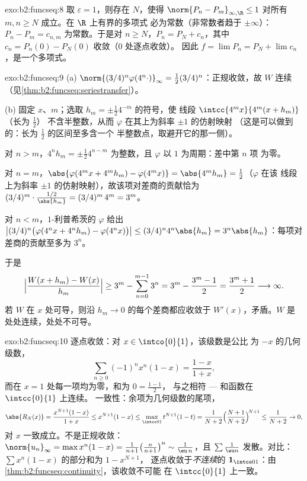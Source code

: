 \begin{solution}{exo:b2:funcseq:8}
取 $\varepsilon = 1$，则存在 $N$，使得 $\norm{P_n - P_m}_{\infty,
\R} \leq 1$ 对所有 $m, n \geq N$ 成立。在 $\R$ 上有界的多项式
必为常数（非常数者趋于 $\pm\infty$）：$P_n - P_m =
c_{n,m}$ 为常数。于是对 $n \geq N$，$P_n = P_N + c_n$，其中
$c_n = P_n(0) - P_N(0)$ 收敛（$0$ 处逐点收敛）。
因此 $f = \lim P_n = P_N + \lim c_n$，是一个多项式。
\end{solution}

\begin{solution}{exo:b2:funcseq:9}
(a) $\norm{(3/4)^n\varphi(4^n\cdot)}_\infty = \frac12
(3/4)^n$：正规收敛，故 $W$ 连续
（见\cref{thm:b2:funcseq:seriestransfer}）。

(b) 固定 $x$、$m$；选取 $h_m = \pm\frac12 4^{-m}$ 的符号，使
线段 $\intcc{4^mx}{4^m(x + h_m)}$（长为 $\frac12$）
不含半整数，从而 $\varphi$ 在其上为斜率 $\pm1$ 的仿射映射
（这是可以做到的：长为 $\frac12$ 的区间至多含一个
半整数点，取避开它的那一侧）。

对 $n > m$，$4^n h_m = \pm\frac12 4^{n-m}$ 为整数，且
$\varphi$ 以 $1$ 为周期：差中第 $n$ 项
为零。

对 $n = m$，$\abs{\varphi(4^m x + 4^m h_m) - \varphi(4^m x)} =
\abs{4^m h_m} = \frac12$（$\varphi$ 在该
线段上为斜率 $\pm 1$ 的仿射映射），故该项对差商的贡献恰为 $(3/4)^m \cdot
\frac{1/2}{\abs{h_m}} = (3/4)^m\,4^m = 3^m$。

对 $n < m$，$1$-利普希茨的 $\varphi$ 给出
$\bigl|(3/4)^n\bigl(\varphi(4^nx + 4^nh_m) -
\varphi(4^nx)\bigr)\bigr| \leq (3/4)^n 4^n\abs{h_m} =
3^n\abs{h_m}$：每项对差商的贡献至多为 $3^n$。

于是
\[
\Bigl|\frac{W(x + h_m) - W(x)}{h_m}\Bigr|
\geq 3^m - \sum_{n=0}^{m-1} 3^n
= 3^m - \frac{3^m - 1}{2} = \frac{3^m + 1}{2}
\longrightarrow \infty .
\]
若 $W$ 在 $x$ 处可导，则沿
$h_m \to 0$ 的每个差商都应收敛于 $W'(x)$，矛盾。$W$ 是
处处连续，处处不可导。
\end{solution}

\begin{solution}{exo:b2:funcseq:10}
逐点收敛：对 $x \in \intco{0}{1}$，该级数是公比
为 $-x$ 的几何级数，
\[
\sum_{n\geq0}(-1)^n x^n(1-x) = \frac{1-x}{1+x},
\]
而在 $x = 1$ 处每一项均为零，和为 $0 = \frac{1-1}{2}$，
与之相符 --- 和函数在 $\intcc{0}{1}$ 上连续。
一致性：余项为几何级数的尾项，
\[
\abs{R_N(x)} = \frac{x^{N+1}(1-x)}{1+x} \leq x^{N+1}(1 - x)
\leq \max_{\intcc01} t^{N+1}(1-t)
= \frac{1}{N+2}\Bigl(\frac{N+1}{N+2}\Bigr)^{\!N+1}
\leq \frac{1}{N+2} \to 0 ,
\]
对 $x$ 一致成立。不是正规收敛：$\norm{u_n}_\infty =
\max x^n(1-x) = \frac{1}{n+1}\bigl(\frac{n}{n+1}\bigr)^n \sim
\frac{1}{\eu\,n}$，且 $\sum \frac1{\eu n}$ 发散。对比：
$\sum x^n(1-x)$ 的部分和为 $1 - x^{N+1}$，
逐点收敛于\emph{不连续}的 $\mathbf 1_{\intco01}$：由
\cref{thm:b2:funcseq:continuity}，该收敛不可能
在 $\intcc{0}{1}$ 上一致。
\end{solution}

